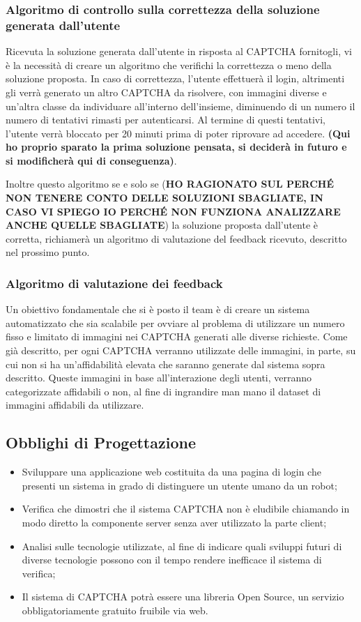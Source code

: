 \subsubsection{Algoritmo di controllo sulla correttezza della soluzione generata dall’utente}
Ricevuta la soluzione generata dall’utente in risposta al CAPTCHA fornitogli, vi è la necessità di creare un algoritmo che verifichi la correttezza o meno della soluzione proposta. In caso di correttezza, l’utente effettuerà il login, altrimenti gli verrà generato un altro CAPTCHA da risolvere, con immagini diverse e un'altra classe da individuare all’interno dell’insieme, diminuendo di un numero il numero di tentativi rimasti per autenticarsi. Al termine di questi tentativi, l’utente verrà bloccato per 20 minuti prima di poter riprovare ad accedere. \textbf{(Qui ho proprio sparato la prima soluzione pensata, si deciderà in futuro e si modificherà qui di conseguenza)}.

Inoltre questo algoritmo se e solo se (\textbf{HO RAGIONATO SUL PERCHÉ NON TENERE CONTO DELLE SOLUZIONI SBAGLIATE, IN CASO VI SPIEGO IO PERCHÉ NON FUNZIONA ANALIZZARE ANCHE QUELLE SBAGLIATE}) la soluzione proposta dall’utente è corretta, richiamerà un algoritmo di valutazione del feedback ricevuto, descritto nel prossimo punto.

\subsubsection{Algoritmo di valutazione dei feedback}
Un obiettivo fondamentale che si è posto il team è di creare un sistema automatizzato che sia scalabile per ovviare al problema di utilizzare un numero fisso e limitato di immagini nei CAPTCHA generati alle diverse richieste. Come già descritto, per ogni CAPTCHA verranno utilizzate delle immagini, in parte, su cui non si ha un’affidabilità elevata che saranno generate dal sistema sopra descritto. Queste immagini in base all'interazione degli utenti, verranno categorizzate affidabili o non, al fine di ingrandire man mano il dataset di immagini affidabili da utilizzare.

\subsection{Obblighi di Progettazione}
\begin{itemize}
    \item Sviluppare una applicazione web costituita da una pagina di login che presenti un sistema in grado di distinguere un utente umano da un robot;
    \item Verifica che dimostri che il sistema CAPTCHA non è eludibile chiamando in modo diretto la componente server senza aver utilizzato la parte client;
    \item Analisi sulle tecnologie utilizzate, al fine di indicare quali sviluppi futuri di diverse tecnologie possono con il tempo rendere inefficace il sistema di verifica;
    \item Il sistema di CAPTCHA potrà essere una libreria Open Source, un servizio obbligatoriamente gratuito fruibile via web.
\end{itemize}

